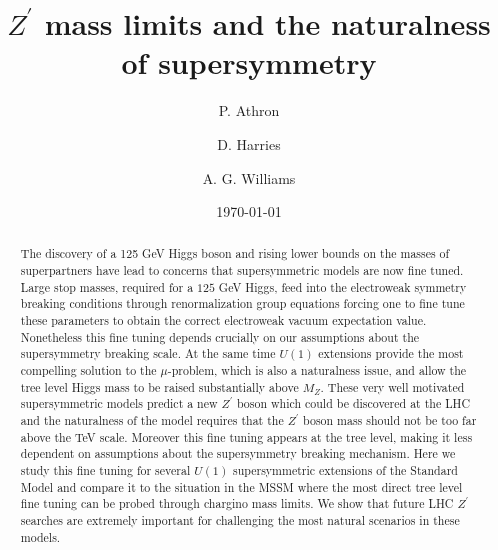 \documentclass[preprint,amsmath,amssymb,aps,superscriptaddress,prd,
showpacs,floatfix,nofootinbib]{revtex4-1}
\begin{document}
\title {$Z^\prime$ mass limits and the naturalness of supersymmetry}

\author{P. Athron}

\author{D. Harries}

\author{A. G. Williams}

\date{\today}

\begin{abstract}

The discovery of a 125 GeV Higgs boson and rising lower bounds on the
masses of superpartners have lead to concerns that supersymmetric
models are now fine tuned.  Large stop masses, required for a $125$
GeV Higgs, feed into the electroweak symmetry breaking conditions
through renormalization group equations forcing one to fine tune these
parameters to obtain the correct electroweak vacuum expectation value.
Nonetheless this fine tuning depends crucially on our assumptions about
the supersymmetry breaking scale.  At the same time $U(1)$ extensions
provide the most compelling solution to the $\mu$-problem, which is also
a naturalness issue, and allow the tree level Higgs mass to be raised
substantially above $M_Z$.  These very well motivated supersymmetric models
predict a new $Z^\prime$ boson which could be discovered at the LHC and the
naturalness of the model requires that the $Z^\prime$ boson mass
should not be too far above the TeV scale.  Moreover this fine tuning
appears at the tree level, making it less dependent on assumptions
about the supersymmetry breaking mechanism.  Here we study this fine tuning
for several $U(1)$ supersymmetric extensions of the Standard Model and
compare it to the situation in the MSSM where the most direct tree
level fine tuning can be probed through chargino mass limits.  We show
that future LHC $Z^\prime$ searches are extremely important for
challenging the most natural scenarios in these models.

\end{abstract}
\end{document}
